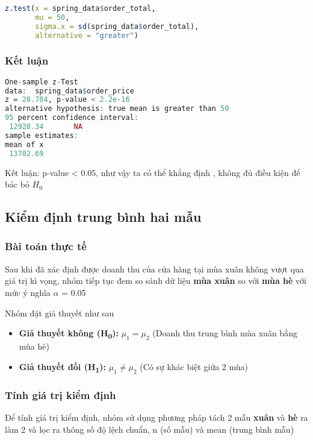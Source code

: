 \begin{lstlisting}[language=R, caption=Kiểm định một mẫu]
z.test(x = spring_data$order_total,
       mu = 50,
       sigma.x = sd(spring_data$order_total),
       alternative = "greater")
\end{lstlisting}


\subsubsection{Kết luận}

\begin{lstlisting}[language=R, caption=Kết quả sau khi dùng t-test]
    One-sample z-Test
data:  spring_data$order_price
z = 28.704, p-value < 2.2e-16
alternative hypothesis: true mean is greater than 50
95 percent confidence interval:
 12920.34       NA
sample estimates:
mean of x 
 13702.69 
\end{lstlisting}

\begin{boxH}
    Kết luận: p-value < 0.05, như vậy ta có thể khẳng định , không đủ điều kiện để bác bỏ $H_0$
\end{boxH}


\subsection{Kiểm định trung bình hai mẫu}
\subsubsection{Bài toán thực tế}
Sau khi đã xác định được doanh thu của cửa hàng tại mùa xuân không vượt qua giá trị kì vọng, nhóm tiếp tục đem so sánh dữ liệu \textbf{mùa xuân}
so với \textbf{mùa hè} với mức ý nghĩa $\alpha$ = 0.05

Nhóm đặt giả thuyết như sau
\begin{itemize}
    \item \textbf{Giả thuyết không (H\textsubscript{0}):} $\mu_1 = \mu_2$ (Doanh thu trung bình mùa xuân bằng mùa hè)
    \item \textbf{Giả thuyết đối (H\textsubscript{1}):} $\mu_1 \ne \mu_2$ (Có sự khác biệt giữa 2 mùa)
\end{itemize}
\subsubsection{Tính giá trị kiểm định}
Để tính giá trị kiểm định, nhóm sử dụng phương pháp tách 2 mẫu \textbf{xuân} và \textbf{hè} ra làm 2 và lọc ra thông số độ lệch chuẩn, n (số mẫu) và mean (trung bình mẫu)

